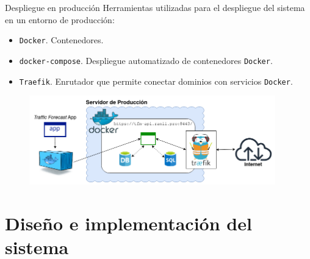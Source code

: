 \documentclass[aspectratio=169,xcolor=dvipsnames]{beamer}
\begin{document}
	
	\begin{frame}{Despliegue en producción}
		Herramientas utilizadas para el despliegue del sistema en un entorno de producción:
		
		\begin{itemize}
			\item \texttt{Docker}. Contenedores.
			\item \texttt{docker-compose}. Despliegue automatizado de contenedores \texttt{Docker}.
			\item \texttt{Traefik}. Enrutador que permite conectar dominios con servicios \texttt{Docker}.
		\end{itemize}
	
		\begin{figure}[h!]
			\begin{center}
				\includegraphics[width=0.95\textwidth]{diag/produccion_tfm.png}
			\end{center}
		\end{figure}
	\end{frame}
	
	
	\section{Diseño e implementación del sistema}
	
\end{document}
